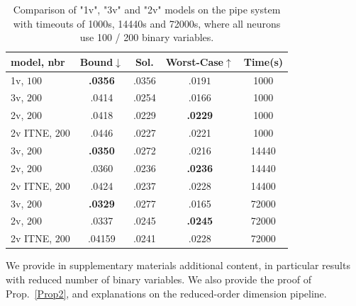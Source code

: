		
	\begin{table}[h!]
	\begin{tabular}{||l||c|c|c|c||}\hline\hline
		model, nbr&        Bound$\downarrow$ &  Sol. &      Worst-Case$\uparrow$ &  Time(s) \\\hline \hline
		1v, $100$ &     {\bf .0356} &  $.0356$ & $.0191$ &  1000 \\\hline
		3v, $200$&     .0414 &  .0254 &  .0166 &  1000 \\\hline
		2v, $200$&     .0418 &  .0229 &   {\bf .0229} &  1000 \\\hline 
		2v ITNE, $200$&  .0446  & .0227 &  .0221  &  1000 \\\hline\hline
		3v, $200$&      {\bf .0350} &  .0272 &  .0216 & 14440 \\\hline
		2v, $200$&     .0360 &  .0236 &    {\bf .0236} & 14440 \\\hline 
		2v ITNE, $200$& .0424  &  .0237  & .0228   &  14400 \\\hline\hline
		3v, $200$&     {\bf .0329} &  .0277 &  .0165 & 72000 \\\hline
		2v, $200$&     .0337 &  .0245 &  {\bf .0245} & 72000 \\\hline
		2v ITNE, $200$&  .04159 & .0241 &  .0228  &  72000 \\\hline\hline
	\end{tabular}
	\caption{Comparison of "1v", "3v" and "2v" models on the pipe system with timeouts of 1000s, 14440s and 72000s, where all neurons use 100 / 200 binary variables.}
	\label{table.pipe}
\end{table}

\newpage

 We provide in supplementary materials additional content, in particular results with reduced number of binary variables. We also provide the proof of Prop.~\ref{Prop2}, and explanations on the reduced-order dimension pipeline.